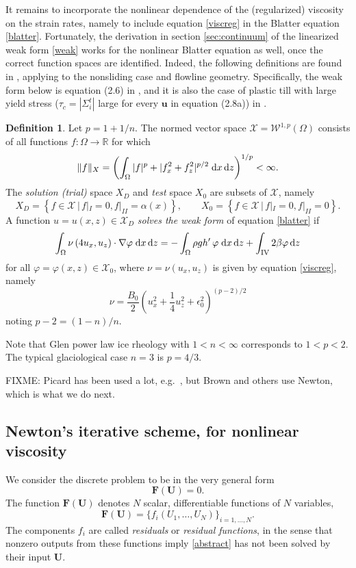 \documentclass[11pt,final,reqno]{amsart}
\theoremstyle{remark}
\theoremstyle{definition}
\newtheorem*{defn}{Definition}
\newcommand{\eps}{\epsilon}
\newcommand{\RR}{\mathbb{R}}
\newcommand{\bbF}{\mathbf{F}}
\newcommand{\bU}{\mathbf{U}}
\newcommand{\WonepX}[1]{\mathcal{W}^{1,p}_{#1}(\Omega)}
\newcommand{\Wonep}{\WonepX{}}
\newcommand{\X}{\mathcal{X}}
\newcommand{\XD}{\mathcal{X}_D}
\newcommand{\Xzero}{\mathcal{X}_0}
\begin{document}
It remains to incorporate the nonlinear dependence of the (regularized) viscosity on the strain rates, namely to include equation \eqref{viscreg} in the Blatter equation \eqref{blatter}.  Fortunately, the derivation in section  \ref{sec:continuum} of the linearized weak form \eqref{weak} works for the nonlinear Blatter equation as well, once the correct function spaces are identified.  Indeed, the following definitions are found in \cite{RappazReist05,SchoofCoulombBlatter}, applying to the nonsliding case and flowline geometry.  Specifically, the weak form below is equation (2.6) in \cite{RappazReist05}, and it is also the case of plastic till with large yield stress ($\tau_c=|\Sigma_i^t|$ large for every $\mathbf{u}$ in equation (2.8a)) in \cite{SchoofCoulombBlatter}.

\begin{defn}  Let $p=1+1/n$.  The normed vector space $\X=\Wonep$ consists of all functions $f : \Omega \to \RR$ for which \cite{Evans}
	$$\|f\|_X = \left(\int_\Omega |f|^p + |f_x^2 + f_z^2|^{p/2} \;\mathrm{d}x\,\mathrm{d}z\right)^{1/p} < \infty.$$
The \emph{solution (trial)} space $X_D$ and \emph{test} space $X_0$ are subsets of $\X$, namely
     $$X_D = \left\{f \in \X \,\Big|\, f|_{I} = 0, f|_{II} = \alpha(x)\right\}, \qquad X_0 = \left\{f \in \X \,\Big|\, f|_{I} = 0, f|_{II} = 0\right\}.$$
A function $u=u(x,z)\in \XD$ \emph{solves the weak form} of equation \eqref{blatter} if
\begin{equation}
\int_\Omega \nu\, (4 u_x, u_z) \cdot \nabla \varphi \;\mathrm{d}x\,\mathrm{d}z = - \int_\Omega \rho g h'\,\varphi \;\mathrm{d}x\,\mathrm{d}z + \int_{\mathrm{IV}} 2 \beta \varphi \,\mathrm{d}z \label{weakfull}
\end{equation}
for all $\varphi=\varphi(x,z)\in \Xzero$, where $\nu = \nu(u_x,u_z)$ is given by equation \eqref{viscreg}, namely
     $$\nu = \frac{B_0}{2} \left(u_x^2 + \frac{1}{4}u_z^2 + \eps_0^2\right)^{(p-2)/2}$$
noting $p-2 = (1-n)/n$.
\end{defn}

Note that Glen power law ice rheology with $1<n<\infty$ corresponds to $1<p<2$.  The typical glaciological case $n=3$ is $p=4/3$.

FIXME:  Picard has been used a lot, e.g.~\cite{Pattyn03}, but Brown and others \cite{BrownSmithAhmadia2013} use Newton, which is what we do next.

\subsection*{Newton's iterative scheme, for nonlinear viscosity}  We consider the discrete problem to be in the very general form
\begin{equation}
   \bbF(\bU) = 0.  \label{abstract}
\end{equation}
The function $\bbF(\bU)$ denotes $N$ scalar, differentiable functions of $N$ variables,
	$$\bbF(\bU)=\{f_i(U_1,\dots,U_N)\}_{i=1,\dots,N}.$$
The components $f_i$ are called \emph{residuals} or \emph{residual functions}, in the sense that nonzero outputs from these functions imply \eqref{abstract} has not been solved by their input $\bU$.
\end{document}
